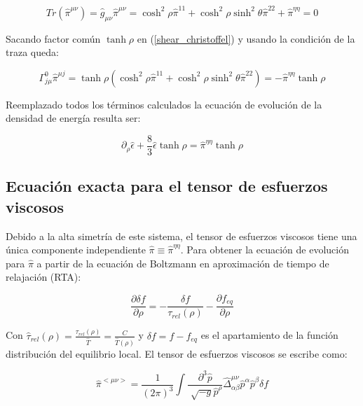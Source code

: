 \documentclass[11pt,a4paper]{article}
\begin{document}
\begin{equation}
Tr(\hat{\pi}^{{\mu}{\nu}})=\hat{g}_{{\mu}{\nu}}\hat{\pi}^{{\mu}{\nu}}=\cosh^2\rho\hat{\pi}^{{1}{1}}+\cosh^2\rho\sinh^2\theta\hat{\pi}^{{2}{2}}+\hat{\pi}^{{\eta}{\eta}}=0
\label{traza_shear}
\end{equation}


Sacando factor común $\tanh\rho$ en (\ref{shear_christoffel}) y usando la condición de la traza queda:


\begin{equation}
\Gamma^{0}_{{j}{\mu}}\hat{\pi}^{{\mu}{j}}= \tanh\rho(\cosh^2\rho\hat{\pi}^{{1}{1}}+\cosh^2\rho\sinh^2\theta\hat{\pi}^{{2}{2}})=-\hat{\pi}^{{\eta}{\eta}}\tanh\rho
\end{equation}


Reemplazado todos los términos calculados la ecuación de evolución de la densidad de energía resulta ser:

\begin{equation}
\partial_{\rho}\hat{\epsilon}+\frac{8}{3}\hat{\epsilon}\tanh\rho=\hat{\pi}^{{\eta}{\eta}}\tanh\rho
\label{ecuacion_energia}
\end{equation}

\subsection{Ecuación exacta para el tensor de esfuerzos viscosos}

Debido a la alta simetría de este sistema, el tensor de esfuerzos viscosos tiene una única componente independiente $\hat{\pi}\equiv\hat{\pi}^{{\eta}{\eta}}$. Para obtener la ecuación de evolución para $\hat{\pi}$ a partir de la ecuación de Boltzmann en aproximación de tiempo de relajación (RTA):

\begin{equation}
\frac{\partial\delta{f}}{\partial\rho}=-\frac{\delta{f}}{\tau_{rel}(\rho)}-\frac{\partial{f}_{eq}}{\partial\rho}
\end{equation}

Con $\hat{\tau}_{rel}(\rho)=\frac{\tau_{rel}(\rho)}{\hat{T}}=\frac{C}{\hat{T}(\rho)}$ y $\delta{f}=f-f_{eq}$ es el apartamiento de la función distribución del equilibrio local. El tensor de esfuerzos viscosos se escribe como:

\begin{equation}
\hat{\pi}^{<{\mu}{\nu}>}=\frac{1}{(2\pi)^3}\int{\frac{\partial^3\hat{p}}{\sqrt[]{-g}\hat{p}^{\rho}}}\hat{\Delta}^{{\mu}{\nu}}_{{\alpha}{\beta}}\hat{p}^{\alpha}\hat{p}^{\beta}\delta{f}
\label{boltzmann_df}
\end{equation}
\end{document}

